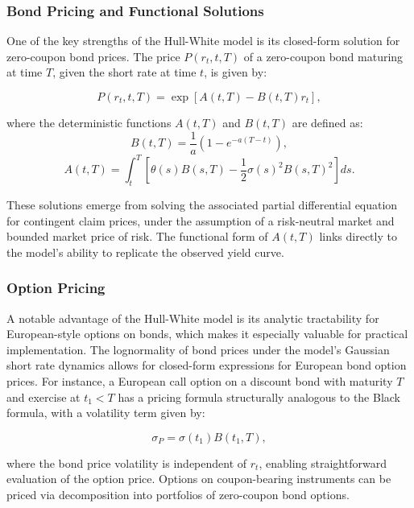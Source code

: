 \subsubsection{Bond Pricing and Functional Solutions}
One of the key strengths of the Hull-White model is its closed-form solution for zero-coupon bond prices. The price \( P(r_t, t, T) \) of a zero-coupon bond maturing at time \( T \), given the short rate at time \( t \), is given by:

\begin{equation}
P(r_t, t, T) = \exp\left[ A(t, T) - B(t, T) r_t \right],
\end{equation}

where the deterministic functions \( A(t, T) \) and \( B(t, T) \) are defined as:
\begin{equation}
B(t, T) = \frac{1}{a} \left(1 - e^{-a(T - t)}\right),
\end{equation}
\begin{equation}
A(t, T) = \int_t^T \left[ \theta(s) B(s, T) - \frac{1}{2} \sigma(s)^2 B(s, T)^2 \right] ds.
\end{equation}

These solutions emerge from solving the associated partial differential equation for contingent claim prices, under the assumption of a risk-neutral market and bounded market price of risk. The functional form of \( A(t, T) \) links directly to the model's ability to replicate the observed yield curve.

\subsubsection{Option Pricing}
A notable advantage of the Hull-White model is its analytic tractability for European-style options on bonds, which makes it especially valuable for practical implementation. The lognormality of bond prices under the model’s Gaussian short rate dynamics allows for closed-form expressions for European bond option prices. For instance, a European call option on a discount bond with maturity \( T \) and exercise at \( t_1 < T \) has a pricing formula structurally analogous to the Black formula, with a volatility term given by:

\begin{equation}
\sigma_P = \sigma(t_1) B(t_1, T),
\end{equation}

where the bond price volatility is independent of \( r_t \), enabling straightforward evaluation of the option price. Options on coupon-bearing instruments can be priced via decomposition into portfolios of zero-coupon bond options.

